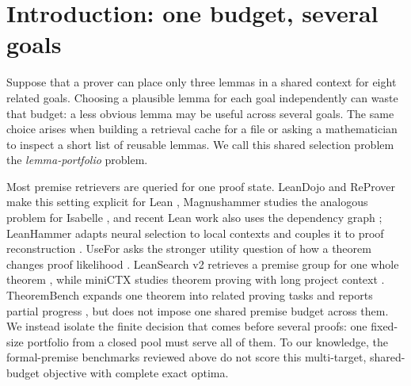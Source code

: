 \begin{abstract}
Premise selection normally asks which lemmas may help one proof state.  We study
the shared-budget problem: which small lemma set best serves several related
goals at once?  A \method{} episode displays the types of 16 name-masked
candidates and eight name-masked targets, and asks for three candidates.  A
target is covered when at least one chosen candidate occurs directly in its
historical elaborated value.  We construct 30 development and 60 test episodes
from \mathlib{} v4.33.0, enumerate all 560 portfolios, retain every maximizer,
and independently replay the dependency labels in pinned Lean.  The public test
set and label digest were committed before the response document was supplied.
\ResultAbstractSentence On 20 matched items, a support-prediction decomposition
attained 1/20 exact optima, compared with 4/20 under direct prompting, locating
a concrete failure mode rather than an improvement.  The task measures compression of historical dependencies,
not proof success under added premises.
\end{abstract}

\section{Introduction: one budget, several goals}

Suppose that a prover can place only three lemmas in a shared context for eight
related goals.  Choosing a plausible lemma for each goal independently can
waste that budget: a less obvious lemma may be useful across several goals.
The same choice arises when building a retrieval cache for a file or asking a
mathematician to inspect a short list of reusable lemmas.  We call this shared
selection problem the \emph{lemma-portfolio} problem.

Most premise retrievers are queried for one proof state.  LeanDojo and ReProver
make this setting explicit for Lean \citep{yang2023leandojo}, Magnushammer
studies the analogous problem for Isabelle \citep{mikula2024magnushammer}, and
recent Lean work also uses the dependency graph
\citep{petrovic2025structural}; LeanHammer adapts neural selection to local
contexts and couples it to proof reconstruction \citep{zhu2026leanhammer}.
UseFor asks the stronger utility question of
how a theorem changes proof likelihood \citep{kasriel2025usefor}.  LeanSearch
v2 retrieves a premise group for one whole theorem \citep{gao2026leansearchv2},
while miniCTX studies theorem proving with long project context
\citep{hu2025minictx}.  TheoremBench expands one theorem into related proving
tasks and reports partial progress \citep{pham2026theorembench}, but does not
impose one shared premise budget across them.  We instead isolate the finite
decision that comes before several proofs: one fixed-size portfolio from a
closed pool must serve all of them.  To our knowledge, the formal-premise
benchmarks reviewed above do not score this multi-target, shared-budget
objective with complete exact optima.

